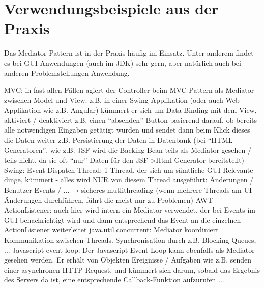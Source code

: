 \section{Verwendungsbeispiele aus der Praxis}
Das Mediator Pattern ist in der Praxis häufig im Einsatz. Unter anderem findet es bei GUI-Anwendungen (auch im JDK) sehr gern, aber natürlich auch bei anderen Problemstellungen Anwendung.
\begin{outline}
    \1 MVC: in fast allen Fällen agiert der Controller beim MVC Pattern als Mediator zwischen Model und View. z.B. in einer Swing-Applikation (oder auch Web-Applikation wie z.B. Angular) kümmert er sich um Data-Binding mit dem View, aktiviert / deaktiviert z.B. einen \enquote{absenden} Button basierend darauf, ob bereits alle notwendigen Eingaben getätigt wurden und sendet dann beim Klick dieses die Daten weiter z.B. Persistierung der Daten in Datenbank
    (bei \enquote{HTML-Generatoren}, wie z.B. JSF wird die Backing-Bean teils als Mediator gesehen / teils nicht, da sie oft \enquote{nur} Daten für den JSF->Html Generator bereitstellt)
    \1 Swing: Event Dispatch Thread: 1 Thread, der sich um sämtliche GUI-Relevante dinge, kümmert - alles wird NUR von diesem Thread ausgeführt: Änderungen / Benutzer-Events / ... → sicheres mutlithreading (wenn mehrere Threads am UI Änderungen durchführen, führt die meist nur zu Problemen)
    \1 AWT ActionListener: auch hier wird intern ein Mediator verwendet, der bei Events im GUI benachrichtigt wird und dann entsprechend das Event an die einzelnen ActionListener weiterleitet
    \1 java.util.concurrent: Mediator koordiniert Kommunikation zwischen Threads. Synchronisation durch z.B. Blocking-Queues, ...
    \1 Javascript event loop: Der Javascript Event Loop kann ebenfalls als Mediator gesehen werden. Er erhält von Objekten Ereignisse / Aufgaben wie z.B. senden einer asynchronen HTTP-Request, und kümmert sich darum, sobald das Ergebnis des Servers da ist, eine entsprechende Callback-Funktion aufzurufen
    \1 ...
\end{outline}
